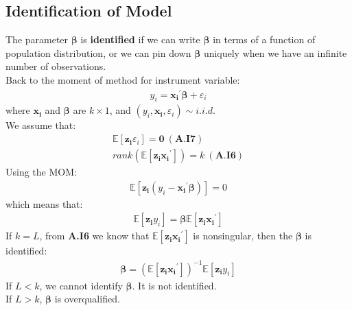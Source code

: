 \documentclass{article}
\begin{document}
\subsection{Identification of Model}
The parameter $\boldsymbol{\beta}$ is \textbf{identified} if we can write $\boldsymbol{\beta}$ in terms of a function of population distribution, or we can pin down $\boldsymbol{\beta}$ uniquely when we have an infinite number of observations.\\
Back to the moment of method for instrument variable:
	\begin{align*}
		y_i = \boldsymbol{x_i}^\prime \boldsymbol{\beta} + \varepsilon_i
	\end{align*}
where $\boldsymbol{x_i}$ and $\boldsymbol{\beta}$ are $k \times 1$, and $(y_i, \boldsymbol{x_i}, \varepsilon_i) \sim i.i.d.$\\
We assume that:
	\begin{align*}
		\mathbb{E} [\boldsymbol{z_i} \varepsilon_i] = \boldsymbol{0}\ (\textbf{A.I7})\\
		rank(\mathbb{E}[\boldsymbol{z_i} \boldsymbol{x_i}^\prime]) = k\ (\textbf{A.I6})
	\end{align*}
Using the MOM:
	\begin{align*}
		\mathbb{E} [\boldsymbol{z_i}(y_i - \boldsymbol{x_i}^\prime \boldsymbol{\beta})] = 0
	\end{align*}
which means that:
	\begin{align*}
		\mathbb{E} [\boldsymbol{z_i} y_i] = \boldsymbol{\beta} \mathbb{E} [\boldsymbol{z_i} \boldsymbol{x_i}^\prime ]
	\end{align*}
If $k = L$, from \textbf{A.I6} we know that $\mathbb{E} [\boldsymbol{z_i} \boldsymbol{x_i}^\prime ]$ is nonsingular, then the $\boldsymbol{\beta}$ is identified:
	\begin{align*}
		\boldsymbol{\beta} = (\mathbb{E} [\boldsymbol{z_i} \boldsymbol{x_i}^\prime ] )^{-1} \mathbb{E} [\boldsymbol{z_i} y_i]
	\end{align*} 
If $L < k$, we cannot identify $\boldsymbol{\beta}$. It is not identified.\\
If $L > k$, $\boldsymbol{\beta}$ is overqualified.
\end{document}
